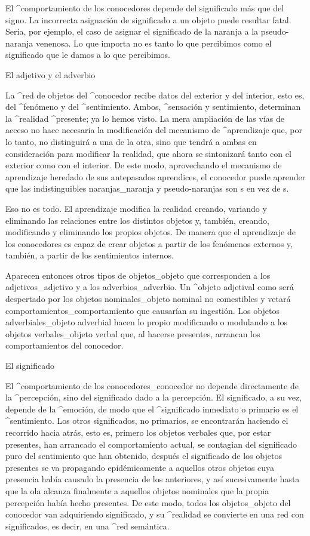 El ^{comportamiento} de los conocedores depende del significado más que
del signo. La incorrecta asignación de significado a un objeto puede
resultar fatal. Sería, por ejemplo, el caso de asignar el significado de
la naranja a la pseudo-naranja venenosa. Lo que importa no es tanto lo
que percibimos como el significado que le damos a lo que percibimos.


\Section El adjetivo y el adverbio

La ^{red de objetos} del ^{conocedor} recibe datos del exterior y del
interior, esto es, del ^{fenómeno} y del ^{sentimiento}. Ambos,
^{sensación} y sentimiento, determinan la ^{realidad} ^{presente}; ya lo
hemos visto. La mera ampliación de las vías de acceso no hace necesaria
la modificación del mecanismo de ^{aprendizaje} que, por lo tanto, no
distinguirá a una de la otra, sino que tendrá a ambas en consideración
para modificar la realidad, que ahora se sintonizará tanto con el
exterior como con el interior. De este modo, aprovechando el mecanismo
de aprendizaje heredado de sus antepasados aprendices, el conocedor
puede aprender que las indistinguibles naranjas_{naranja} y
pseudo-naranjas son s en vez de s.

Eso no es todo. El aprendizaje modifica la realidad creando, variando y
eliminando las relaciones entre los distintos objetos y, también,
creando, modificando y eliminando los propios objetos. De manera que el
aprendizaje de los conocedores es capaz de crear objetos a partir de los
fenómenos externos y, también, a partir de los sentimientos internos.

Aparecen entonces otros tipos de objetos_{objeto} que corresponden a los
adjetivos_{adjetivo} y a los adverbios_{adverbio}. Un ^{objeto
adjetival} como  será despertado por los objetos
nominales_{objeto nominal} no comestibles y vetará
comportamientos_{comportamiento} que causarían su ingestión. Los objetos
adverbiales_{objeto adverbial} hacen lo propio modificando o modulando a
los objetos verbales_{objeto verbal} que, al hacerse presentes, arrancan
los comportamientos del conocedor.


\Section El significado

El ^{comportamiento} de los conocedores_{conocedor} no depende
directamente de la ^{percepción}, sino del significado dado a la
percepción. El significado, a su vez, depende de la ^{emoción}, de modo
que el ^{significado} inmediato o primario es el ^{sentimiento}. Los
otros significados, no primarios, se encontrarán haciendo el recorrido
hacia atrás, esto es, primero los objetos verbales que, por estar
presentes, han arrancado el comportamiento actual, se contagian del
significado puro del sentimiento que han obtenido, después el
significado de los objetos presentes se va propagando epidémicamente a
aquellos otros objetos cuya presencia había causado la presencia de los
anteriores, y así sucesivamente hasta que la ola alcanza finalmente a
aquellos objetos nominales que la propia percepción había hecho
presentes. De este modo, todos los objetos_{objeto} del conocedor van
adquiriendo significado, y su ^{realidad} se convierte en una red con
significados, es decir, en una ^{red semántica}.


